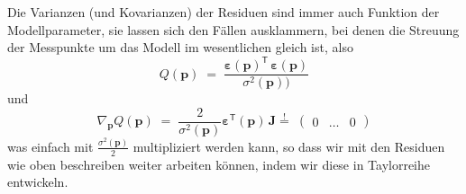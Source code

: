 Die Varianzen (und Kovarianzen) der Residuen sind immer auch Funktion der Modellparameter, sie
lassen sich den Fällen ausklammern, bei denen die Streuung der Messpunkte um das Modell im wesentlichen
gleich ist, also
\begin{equation}
Q(\mathbf{p}) \; = \;
 \frac{\boldsymbol{\varepsilon}(\mathbf{p})^\mathsf{T} \, \boldsymbol{\varepsilon}(\mathbf{p})}{\sigma^2(\mathbf{p}))}
\end{equation}
und
\begin{equation}
\nabla_{\mathbf{p}} Q(\mathbf{p})  \; = \; 
\frac{2}{\sigma^2(\mathbf{p})} \boldsymbol{\varepsilon}^\textsf{T}(\mathbf{p})
 \, \boldsymbol{J} \overset{!}{=} \; \left(\begin{array}{ccc} 0 & \dots & 0 \end{array}\right)
\label{ZielfunktionalGradJmitSigma}
\end{equation}
was einfach mit $\frac{\sigma^2(\mathbf{p})}{2}$ multipliziert werden kann, so dass wir mit
den Residuen wie oben beschreiben weiter arbeiten können, indem wir diese in Taylorreihe entwickeln.


